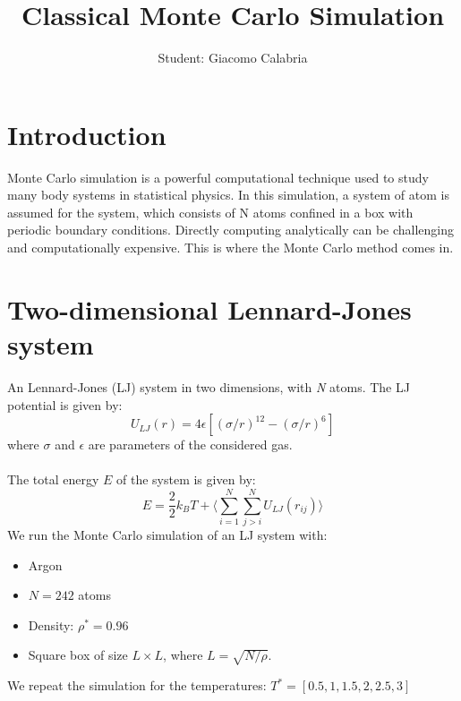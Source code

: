 \documentclass{article}
\title{\textbf{Classical Monte Carlo Simulation}}
\author{Student: Giacomo Calabria}
\date{}
\begin{document}
\maketitle

\section*{Introduction}
Monte Carlo simulation is a powerful computational technique used to study many body systems in statistical physics. In this simulation, a system of atom is assumed for the system, which consists of N atoms confined in a box with periodic boundary conditions. Directly computing analytically can be challenging and computationally expensive. This is where the Monte Carlo method comes in.
\section{Two-dimensional Lennard-Jones system}
An Lennard-Jones (LJ) system in two dimensions, with \textit{N} atoms. The LJ potential is given by:
\begin{equation}
   U_{LJ}(r)=4\epsilon\left[(\sigma/r)^{12}-(\sigma/r)^6\right]
\end{equation}
where $\sigma$ and $\epsilon$ are parameters of the considered gas.\\\\
The total energy $E$ of the system is given by:
\begin{equation}
    E=\frac22k_BT+\Biggl\langle\sum_{i=1}^N{\sum_{j>i}^N{U_{LJ}(r_{ij})}}\Biggr\rangle
\end{equation}
We run the Monte Carlo simulation of an LJ system with:
\begin{itemize}
    \item Argon
    \item $N=242$ atoms
    \item Density: $\rho^*=0.96$
    \item Square box of size $L\times L$, where $L =\sqrt{N/\rho}$.
\end{itemize}
We repeat the simulation for the temperatures: $T^*=[0.5,1,1.5,2,2.5,3]$
\end{document}
